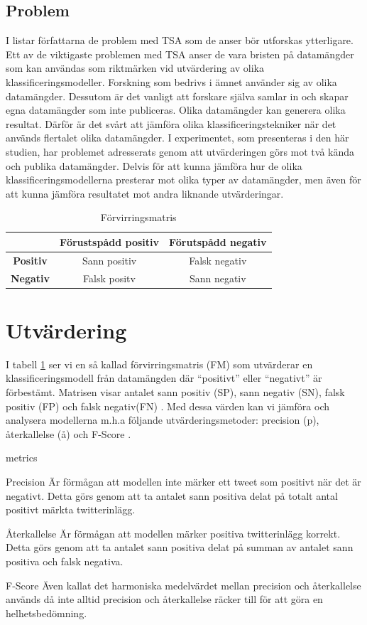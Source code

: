 \documentclass{kaumasters} %
\begin{document}
\subsection{Problem} \label{TSAprob}
I \cite{TSAsurvey} listar författarna de problem med TSA som de anser bör utforskas ytterligare. Ett av de viktigaste problemen med TSA anser de vara bristen på datamängder som kan användas som riktmärken vid utvärdering av olika klassificeringsmodeller. Forskning som bedrivs i ämnet använder sig av olika datamängder. Dessutom är det vanligt att forskare själva samlar in och skapar egna datamängder som inte publiceras. Olika datamängder kan generera olika resultat. Därför är det svårt att jämföra olika klassificeringstekniker när det används flertalet olika datamängder. I experimentet, som presenteras i den här studien, har problemet adresserats genom att utvärderingen görs mot två kända och publika datamängder. Delvis för att kunna jämföra hur de olika klassificeringsmodellerna presterar mot olika typer av datamängder, men även för att kunna jämföra resultatet mot andra liknande utvärderingar.
\begin{table}
\centering
\caption{Förvirringsmatris}
\label{tab:fm}
	\begin{tabular}{ccc}
	\toprule
	 & \textbf{Förustspådd positiv} & \textbf{Förutspådd negativ} \\
	\midrule
	\textbf{Positiv} & Sann positiv & Falsk negativ \\
	\textbf{Negativ} & Falsk positv & Sann negativ \\
	\bottomrule
\end{tabular}
\end{table}

\section{Utvärdering} \label{TSAev}
I tabell \ref{tab:fm} ser vi en så kallad förvirringsmatris (FM) som utvärderar en klassificeringsmodell från datamängden där “positivt” eller “negativt” är förbestämt. Matrisen visar antalet sann positiv (SP), sann negativ (SN), falsk positiv (FP) och falsk negativ(FN) \cite{wiki:003}. Med dessa värden kan vi jämföra och analysera modellerna m.h.a följande utvärderingsmetoder: precision (p),  återkallelse (å) \cite{wiki:002} och F-Score \cite{wiki:001}.

\begin{labeling}{metrics}
\item [Precision]  Är förmågan att modellen inte märker ett tweet som positivt när det är negativt. Detta görs genom att ta antalet sann positiva delat på totalt antal positivt märkta twitterinlägg. 
\item [Återkallelse] Är förmågan att modellen märker positiva twitterinlägg korrekt. Detta görs genom att ta antalet sann positiva delat på summan av antalet sann positiva och falsk negativa.
\item [F-Score] Även kallat det harmoniska medelvärdet mellan precision och återkallelse används då inte alltid precision och återkallelse räcker till för att göra en helhetsbedömning. 
\end{labeling}
\end{document}
